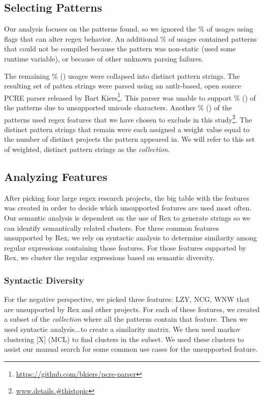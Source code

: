 \subsection{Selecting Patterns}
Our analysis focuses on the patterns found, so we ignored the \%  of usages using flags that can alter regex behavior.  An additional \% of usages contained patterns that could not be compiled because the pattern was non-static (used some runtime variable), or because of other unknown parsing failures.

The remaining \% () usages were collapsed into  distinct pattern strings.  The resulting set of patten strings were parsed using an antlr-based, open source PCRE parser released by Bart Kiers\footnote{\url{https://github.com/bkiers/pcre-parser}}.  This parser was unable to support \% () of the patterns due to unsupported unicode characters.  Another \% () of the patterns used regex features that we have chosen to exclude in this study\footnote{\url{www.details.#thistopic}}.  The  distinct pattern strings that remain were each assigned a weight value equal to the number of distinct projects the pattern appeared in.  We will refer to this set of weighted, distinct pattern strings as the \emph{collection}.

\subsection{Analyzing Features}
\label{study:features}

After picking four large regex research projects, the big table with the features was created in order to decide which unsupported features are used most often.  
Our semantic analysis is dependent on the use of Rex to generate strings so we can identify semantically related clusters. For three common features unsupported by Rex, we rely on syntactic analysis to determine similarity among regular expressions containing those features. For those features supported by Rex, we cluster the regular expressions based on semantic diversity. 

\subsubsection{Syntactic Diversity}
For the negative perspective, we picked three features: LZY, NCG, WNW that are unsupported by Rex and other projects.  For each of these features, we created a subset of the \emph{collection} where all the patterns contain that feature.  Then we used syntactic analysis...to create a similarity matrix.  We then used markov clustering [X] (MCL) to find clusters in the subset.  We used these clusters to assist our manual search for some common use cases for the unsupported feature.

